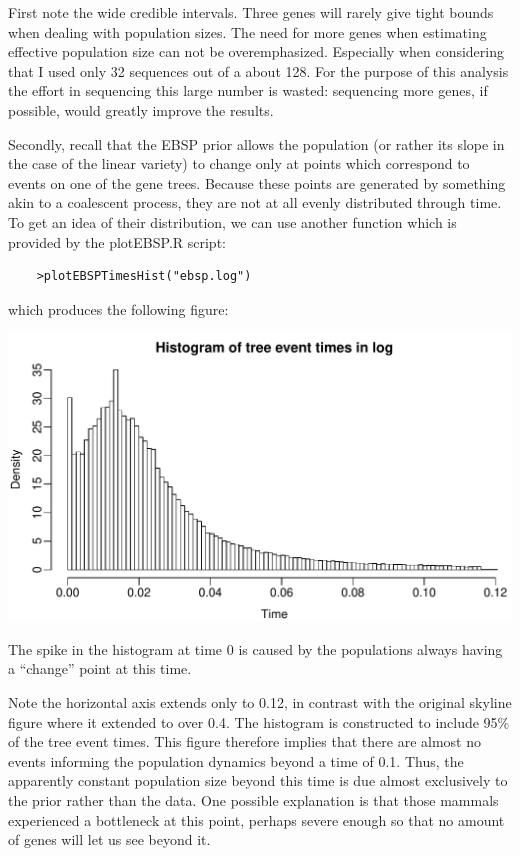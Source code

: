 \documentclass[a4paper,11pt]{article}
\begin{document}
First note the wide credible intervals. Three genes will rarely give tight
bounds when dealing with population sizes. The need for more genes when
estimating effective population size can not be overemphasized. Especially when
considering that I used only 32 sequences out of a about 128. For the purpose
of this analysis the effort in sequencing this large number is wasted:
sequencing more genes, if possible, would greatly improve the results.

Secondly, recall that the EBSP prior allows the population (or rather its
slope in the case of the linear variety) to change only at points which
correspond to events on one of the gene trees.  Because these points are
generated by something akin to a coalescent process, they are not at all evenly
distributed through time.  To get an idea of their distribution, we can use
another function which is provided by the plotEBSP.R script:
\begin{verbatim}
    >plotEBSPTimesHist("ebsp.log")
\end{verbatim}
which produces the following figure:

\includegraphics[width=\textwidth]{figures/mysteryTimesHist.pdf}

The spike in the histogram at time 0 is caused by the populations always having
a ``change'' point at this time.

Note the horizontal axis extends only to 0.12, in contrast with the original
skyline figure where it extended to over 0.4.  The histogram is constructed to
include 95\% of the tree event times. This figure therefore implies that there
are almost no events informing the population dynamics beyond a time of 0.1.
Thus, the apparently constant population size beyond this time is due almost
exclusively to the prior rather than the data.  One possible explanation is
that those mammals experienced a bottleneck at this point, perhaps severe
enough so that no amount of genes will let us see beyond it.
\end{document}
